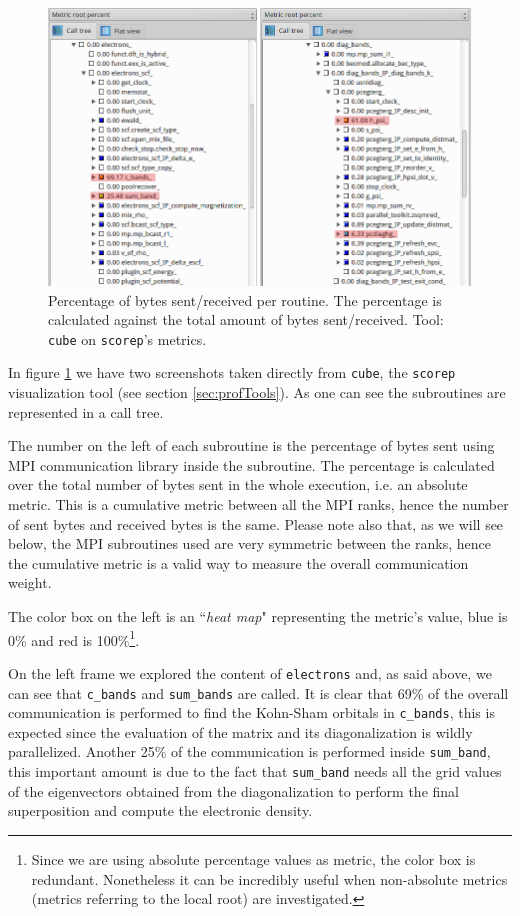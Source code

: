 \documentclass[a4paper,12pt]{article}
\begin{document}
\begin{figure}[hhh!]
	\centerline{\includegraphics[scale=0.5]{cube_MPI.png}}
	\caption{Percentage of bytes sent/received per routine. The percentage is calculated against the total amount of bytes sent/received.  Tool: \texttt{cube} on \texttt{scorep}'s metrics.
	}
	\label{fig:cubeMPI}
\end{figure}

In figure \ref{fig:cubeMPI} we have two screenshots taken directly from \texttt{cube}, the \texttt{scorep} visualization tool (see section \ref{sec:profTools}).
As one can see the subroutines are represented in a call tree.

The number on the left of each subroutine is the percentage of bytes sent using MPI communication library inside the subroutine. 
The percentage is calculated over the total number of bytes sent in the whole execution, i.e. an absolute metric.
This is a cumulative metric between all the MPI ranks, hence the number of sent bytes and received bytes is the same.
Please note also that, as we will see below, the MPI subroutines used are very symmetric between the ranks, hence the cumulative metric is a valid way to measure the overall communication weight.

The color box on the left is an ``\textit{heat map}" representing the metric's value, blue is 0\% and red is 100\%\footnote{Since we are using absolute percentage values as metric, the color box is redundant. Nonetheless it can be incredibly useful when non-absolute metrics (metrics referring to the local root) are investigated.}.

On the left frame we explored the content of \texttt{electrons} and, as said above, we can see that \texttt{c\_bands} and \texttt{sum\_bands} are called.
It is clear that 69\% of the overall communication is performed to find the Kohn-Sham orbitals in \texttt{c\_bands}, this is expected since the evaluation of the matrix and its diagonalization is wildly parallelized.
Another 25\% of the communication is performed inside \texttt{sum\_band}, this important amount is due to the fact that \texttt{sum\_band} needs all the grid values of the eigenvectors obtained from the diagonalization to perform the final superposition and compute the electronic density.
\end{document}
